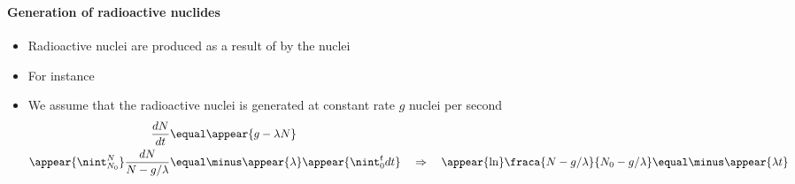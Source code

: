 \begin{frame}
\frametitle{\texorpdfstring{\culine[\sectiontitleulinecolor]{\sectiontitle}}{\sectiontitle} }
\framesubtitle{Generation of radioactive nuclides}%

%
\begin{itemize}
	\item Radioactive nuclei are produced as a result of  by the nuclei  
	
	\item For instance   

\item We assume that the radioactive nuclei is generated at constant rate $g$ nuclei per second
$$
\begin{aligned}
\frac{d N}{d t} & \equal \appear{g-\lambda N} \\
\appear{\nint_{N_{0}}^{N} } \frac{d N}{N-g / \lambda} & \equal  \minus \appear{\lambda} \appear{\nint_{0}^{t} d t} \quad \Rightarrow  \quad \appear{\ln} \fraca{N-g / \lambda}{N_{0}-g / \lambda}  \equal  \minus \appear{\lambda t}
\end{aligned}
$$
\end{itemize}

\endofslide 
\end{frame}

